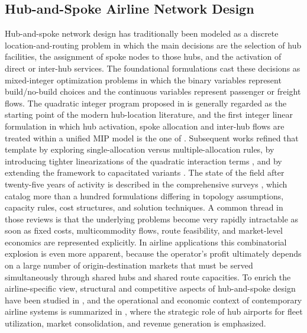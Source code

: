 \subsection{Hub-and-Spoke Airline Network Design}
Hub-and-spoke network design has traditionally been modeled as a discrete location-and-routing problem in which the main decisions are the selection of hub facilities, the assignment of spoke nodes to those hubs, and the activation of direct or inter-hub services. The foundational formulations cast these decisions as mixed-integer optimization problems in which the binary variables represent build/no-build choices and the continuous variables represent passenger or freight flows. The quadratic integer program proposed in \cite{OKelly1987} is generally regarded as the starting point of the modern hub-location literature, and the first integer linear formulation in which hub activation, spoke allocation and inter-hub flows are treated within a unified MIP model is the one of \cite{Campbell1994Integer}. Subsequent works refined that template by exploring single-allocation versus multiple-allocation rules, by introducing tighter linearizations of the quadratic interaction terms \cite{ErnstKrishnamoorthy1996}, and by extending the framework to capacitated variants \cite{Aykin1994}. The state of the field after twenty-five years of activity is described in the comprehensive surveys \cite{AlumurKara2008,CampbellOKelly2012,FarahaniHekmatfarBolooriNikbakhsh2013}, which catalog more than a hundred formulations differing in topology assumptions, capacity rules, cost structures, and solution techniques. A common thread in those reviews is that the underlying problems become very rapidly intractable as soon as fixed costs, multicommodity flows, route feasibility, and market-level economics are represented explicitly. In airline applications this combinatorial explosion is even more apparent, because the operator's profit ultimately depends on a large number of origin-destination markets that must be served simultaneously through shared hubs and shared route capacities. To enrich the airline-specific view, structural and competitive aspects of hub-and-spoke design have been studied in \cite{AdlerSmilowitz2007}, and the operational and economic context of contemporary airline systems is summarized in \cite{BelobabaOdoniBarnhart2015}, where the strategic role of hub airports for fleet utilization, market consolidation, and revenue generation is emphasized.

